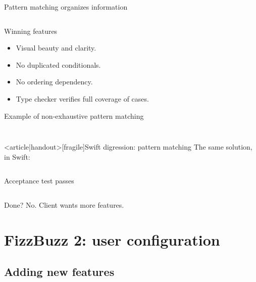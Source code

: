 \begin{frame}[fragile]{Pattern matching organizes information}
  \inputminted[gobble=2]{scala}{FizzBuzz2.scala}

  \begin{block}{Winning features}
    \begin{itemize}
    \item Visual \alert{beauty} and clarity.
    \item No duplicated conditionals.
    \item No ordering dependency.
    \item \alert{Type checker} verifies \alert{full coverage} of cases.
    \end{itemize}
  \end{block}
\end{frame}

\begin{frame}[fragile]{Example of non-exhaustive pattern matching}
  \inputminted[gobble=2]{scala}{FizzBuzz2Bad.scala}

  \inputminted{console}{testQuick4.console}
\end{frame}

\begin{frame}<article|handout>[fragile]{Swift digression: pattern matching}
  The same solution, in Swift:

  \inputminted{ocaml}{FizzBuzz2.swift}
\end{frame}

\begin{frame}[fragile]{Acceptance test passes}

  \inputminted{console}{testQuick5.console}

  \begin{block}{Done?}
    No. Client wants more features.
  \end{block}
\end{frame}

\section{FizzBuzz 2: user configuration}

\subsection{Adding new features}

